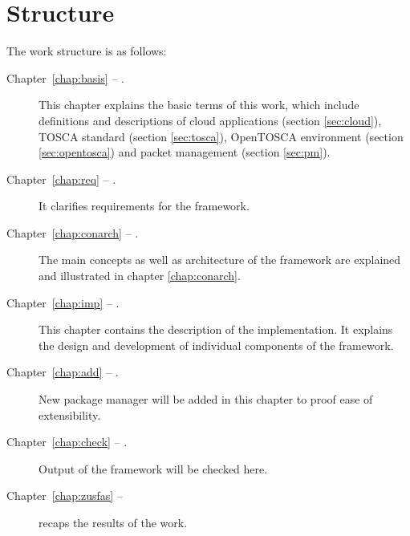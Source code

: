 \section*{Structure}
The work structure is as follows:
\begin{description}
\item[Chapter~\ref{chap:basis} -- .] This chapter explains the basic terms of this work, which include definitions and descriptions of cloud applications (section \ref{sec:cloud}), TOSCA standard (section \ref{sec:tosca}), OpenTOSCA environment  (section \ref{sec:opentosca}) and packet management (section \ref{sec:pm}).
\item[Chapter~\ref{chap:req} -- .] It clarifies requirements for the framework.
\item[Chapter~\ref{chap:conarch} -- .] The main concepts as well as architecture of the framework are explained and illustrated in chapter \ref{chap:conarch}.
\item[Chapter~\ref{chap:imp} -- .] This chapter contains the description of the implementation.
 It explains the design and development of individual components of the framework. 
\item[Chapter~\ref{chap:add} -- .] New package manager will be added in this chapter to proof ease of extensibility. 
\item[Chapter~\ref{chap:check} -- .] Output of the framework will be checked here.
\item[Chapter~\ref{chap:zusfas} -- ] recaps the results of the work.
\end{description}
